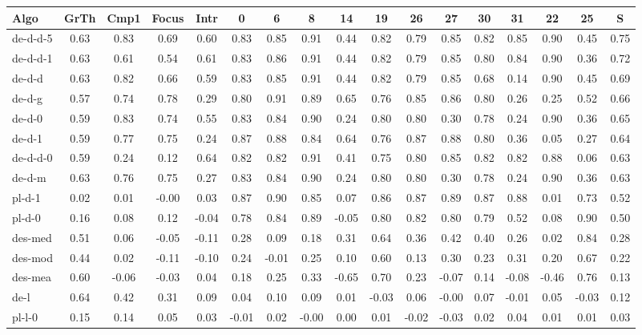 \begin{tabular}{ l | c|c|c|c|c|c|c|c|c|c|c|c|c|c|c | c }
Algo& GrTh & Cmp1 & Focus & Intr & 0 & 6 & 8 & 14 & 19 & 26 & 27 & 30 & 31 & 22 & 25 & S\\\hline
de-d-d-5  & 0.63 & 0.83 & 0.69 & 0.60 & 0.83 & 0.85 & 0.91 & 0.44 & 0.82 & 0.79 & 0.85 & 0.82 & 0.85 & 0.90 & 0.45& 0.75\\\hline
de-d-d-1  & 0.63 & 0.61 & 0.54 & 0.61 & 0.83 & 0.86 & 0.91 & 0.44 & 0.82 & 0.79 & 0.85 & 0.80 & 0.84 & 0.90 & 0.36& 0.72\\\hline
de-d-d  & 0.63 & 0.82 & 0.66 & 0.59 & 0.83 & 0.85 & 0.91 & 0.44 & 0.82 & 0.79 & 0.85 & 0.68 & 0.14 & 0.90 & 0.45& 0.69\\\hline
de-d-g  & 0.57 & 0.74 & 0.78 & 0.29 & 0.80 & 0.91 & 0.89 & 0.65 & 0.76 & 0.85 & 0.86 & 0.80 & 0.26 & 0.25 & 0.52& 0.66\\\hline
de-d-0  & 0.59 & 0.83 & 0.74 & 0.55 & 0.83 & 0.84 & 0.90 & 0.24 & 0.80 & 0.80 & 0.30 & 0.78 & 0.24 & 0.90 & 0.36& 0.65\\\hline
de-d-1  & 0.59 & 0.77 & 0.75 & 0.24 & 0.87 & 0.88 & 0.84 & 0.64 & 0.76 & 0.87 & 0.88 & 0.80 & 0.36 & 0.05 & 0.27& 0.64\\\hline
de-d-d-0  & 0.59 & 0.24 & 0.12 & 0.64 & 0.82 & 0.82 & 0.91 & 0.41 & 0.75 & 0.80 & 0.85 & 0.82 & 0.82 & 0.88 & 0.06& 0.63\\\hline
de-d-m  & 0.63 & 0.76 & 0.75 & 0.27 & 0.83 & 0.84 & 0.90 & 0.24 & 0.80 & 0.80 & 0.30 & 0.78 & 0.24 & 0.90 & 0.36& 0.63\\\hline
pl-d-1  & 0.02 & 0.01 & -0.00 & 0.03 & 0.87 & 0.90 & 0.85 & 0.07 & 0.86 & 0.87 & 0.89 & 0.87 & 0.88 & 0.01 & 0.73& 0.52\\\hline
pl-d-0  & 0.16 & 0.08 & 0.12 & -0.04 & 0.78 & 0.84 & 0.89 & -0.05 & 0.80 & 0.82 & 0.80 & 0.79 & 0.52 & 0.08 & 0.90& 0.50\\\hline
des-med  & 0.51 & 0.06 & -0.05 & -0.11 & 0.28 & 0.09 & 0.18 & 0.31 & 0.64 & 0.36 & 0.42 & 0.40 & 0.26 & 0.02 & 0.84& 0.28\\\hline
des-mod  & 0.44 & 0.02 & -0.11 & -0.10 & 0.24 & -0.01 & 0.25 & 0.10 & 0.60 & 0.13 & 0.30 & 0.23 & 0.31 & 0.20 & 0.67& 0.22\\\hline
des-mea  & 0.60 & -0.06 & -0.03 & 0.04 & 0.18 & 0.25 & 0.33 & -0.65 & 0.70 & 0.23 & -0.07 & 0.14 & -0.08 & -0.46 & 0.76& 0.13\\\hline
de-l  & 0.64 & 0.42 & 0.31 & 0.09 & 0.04 & 0.10 & 0.09 & 0.01 & -0.03 & 0.06 & -0.00 & 0.07 & -0.01 & 0.05 & -0.03& 0.12\\\hline
pl-l-0  & 0.15 & 0.14 & 0.05 & 0.03 & -0.01 & 0.02 & -0.00 & 0.00 & 0.01 & -0.02 & -0.03 & 0.02 & 0.04 & 0.01 & 0.01& 0.03\\\hline

\end{tabular}
